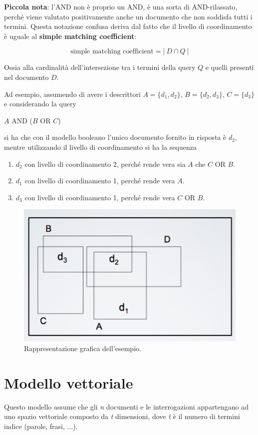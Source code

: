 \textbf{Piccola nota}: l'AND non è proprio un AND, è una sorta di AND-rilassato, perché viene valutato positivamente anche un documento che non soddisfa tutti i termini. Questa notazione confusa deriva dal fatto che il livello di coordinamento è uguale al \textbf{simple matching coefficient}:

$$
\text{simple matching coefficient} = |\ D \cap Q \ |
$$

\noindent Ossia alla cardinalità dell'intersezione tra i termini della query $Q$ e quelli presenti nel documento $D$.

Ad esempio, assumendo di avere i descrittori $A = \{d_1, d_2\}$, $B = \{d_2, d_3\}$, $C =\{d_3\}$ e considerando la query

\begin{center}
	$A$ AND ($B$ OR $C$)
\end{center}

\noindent si ha che con il modello booleano l'unico documento fornito in risposta è $d_2$, mentre utilizzando il livello di coordinamento si ha la sequenza
\begin{enumerate}
	\item $d_2$ con livello di coordinamento 2, perché rende vera sia $A$ che $C$ OR $B$.
	\item $d_1$ con livello di coordinamento 1, perché rende vera $A$.
	\item $d_3$ con livello di coordinamento 1, perché rende vera $C$ OR $B$.
\end{enumerate}

\begin{figure}[htbp]
	\centering
	\includegraphics[width=0.4\linewidth]{images/l8-cord-gen}
	\caption{Rappresentazione grafica dell'esempio.}
\end{figure}

\section{Modello vettoriale}

Questo modello assume che gli \textit{n} documenti e le interrogazioni appartengano ad uno spazio vettoriale composto da \textit{t} dimensioni, dove \textit{t} è il numero di termini indice (parole, frasi, $\ldots$).

